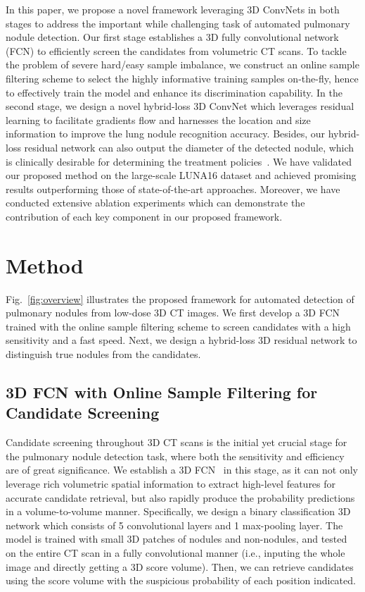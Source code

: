 \documentclass{llncs}
\begin{document}
In this paper, we propose a novel framework leveraging 3D ConvNets in both stages to address the important while challenging task of automated pulmonary nodule detection.
Our first stage establishes a 3D fully convolutional network (FCN) to efficiently screen the candidates from volumetric CT scans.
To tackle the problem of severe hard/easy sample imbalance, we construct an online sample filtering scheme to select the highly informative training samples on-the-fly, hence to effectively train the model and enhance its discrimination capability.
In the second stage, we design a novel hybrid-loss 3D ConvNet which leverages residual learning to facilitate gradients flow and harnesses the location and size information to improve the lung nodule recognition accuracy.
Besides, our hybrid-loss residual network can also output the diameter of the detected nodule, which is clinically desirable for determining the treatment policies~\cite{setio2016validation}.
We have validated our proposed method on the large-scale LUNA16 dataset and achieved promising results outperforming those of state-of-the-art approaches.
Moreover, we have conducted extensive ablation experiments which can demonstrate the contribution of each key component in our proposed framework.

\section{Method}

Fig.~\ref{fig:overview} illustrates the proposed framework for automated detection of pulmonary nodules from low-dose 3D CT images.
We first develop a 3D FCN trained with the online sample filtering scheme to screen candidates with a high sensitivity and a fast speed.
Next, we design a hybrid-loss 3D residual network to distinguish true nodules from the candidates.

\vspace{-3mm}
\subsection{3D FCN with Online Sample Filtering for Candidate Screening}

Candidate screening throughout 3D CT scans is the initial yet crucial stage for the pulmonary nodule detection task, where both the sensitivity and efficiency are of great significance.
We establish a 3D FCN~\cite{dou2016automatic} in this stage, as it can not only leverage rich volumetric spatial information to extract high-level features for accurate candidate retrieval, but also rapidly produce the probability predictions in a volume-to-volume manner.
Specifically, we design a binary classification 3D network which consists of 5 convolutional layers and 1 max-pooling layer.
The model is trained with small 3D patches of nodules and non-nodules, and tested on the entire CT scan in a fully convolutional manner (i.e., inputing the whole image and directly getting a 3D score volume).
Then, we can retrieve candidates using the score volume with the suspicious probability of each position indicated.
\end{document}
